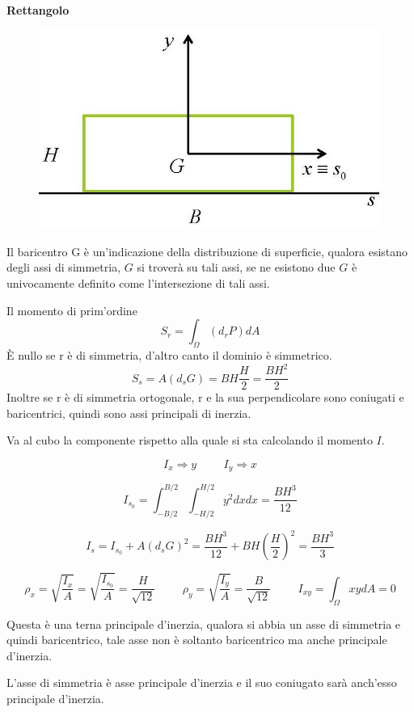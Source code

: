 \documentclass{article}
\begin{document}
\begin{adjustwidth}{2in}{}
{\Large \textbf{Rettangolo}} \mbox{} \newline
\begin{figure}[H]
	\centering
	\includegraphics[width=0.25\linewidth]{immagini/1.PARTE7_Pagina_76}
\end{figure}

	Il baricentro G è un'indicazione della distribuzione di superficie, qualora esistano degli assi di simmetria, $G$ si troverà su tali assi, se ne esistono due $G$ è univocamente definito come l'intersezione di tali assi. \newline 
	
	Il momento di prim'ordine 
	\[ S_r = \int_{\Omega} (d_rP)dA\]
	È nullo se r è di simmetria, d'altro canto il dominio è simmetrico. 
	\[S_s = A (d_sG) = BH\dfrac{H}{2} = \dfrac{BH^2}{2}\]
	Inoltre se r è di simmetria ortogonale, r e la sua
	perpendicolare sono coniugati e baricentrici,
	quindi sono assi principali di inerzia. \newline
	
	Va al cubo la componente rispetto alla quale si sta calcolando il momento $I$. 
	
	\[I_x \Rightarrow y \hspace{1cm} I_y \Rightarrow x\]
	
	\[ I_{s_0} = \int_{-B/2}^{B/2} \int_{-H/2}^{H/2} y^2 dxdx = \dfrac{BH^3}{12}\]
	
	\[ I_s = I_{s_0} + A(d_sG)^2 = \dfrac{BH^3}{12} + BH \left( \dfrac{H}{2} \right)^2 = \dfrac{BH^3}{3} \]
	
	\[ \rho_x = \sqrt{\dfrac{I_x}{A}} = \sqrt{\dfrac{I_{s_0}}{A}} = \dfrac{H}{\sqrt{12}} \hspace{1cm} \rho_y = \sqrt{\dfrac{I_y}{A}} = \dfrac{B}{\sqrt{12}} \hspace{1cm} I_{xy} = \int_{\Omega}xydA = 0 \]
	
	Questa è una terna principale d'inerzia, qualora si abbia un asse di simmetria e quindi baricentrico, tale asse non è soltanto baricentrico ma anche principale d'inerzia. 
	
	L'asse di simmetria è asse principale d'inerzia e il suo coniugato sarà anch'esso principale d'inerzia.  \newline
	

\end{adjustwidth}
\end{document}
